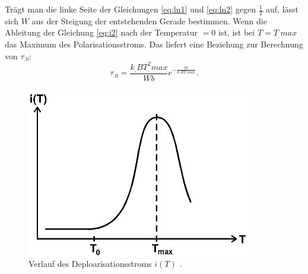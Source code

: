 Trägt man die linke Seite der Gleichungen \eqref{eq:ln1} und \eqref{eq:ln2} gegen $\frac{1}{T}$ auf, lässt sich $W$ aus der Steigung der entstehenden Gerade bestimmen.
Wenn die Ableitung der Gleichung \eqref{eq:i2} nach der Temperatur $=0$ ist, ist bei $T=T_.{max}$ das Maximum des Polarisationsstroms.
Das liefert eine Beziehung zur Berechnung von $\tau_.0$:
\begin{equation}
\tau_.0=\frac{k_.BT^2_.{max}}{W b}e^{-\frac{W}{k_.BT_.{max}}}\text{.}\label{eq:tau0}
\end{equation}
\begin{figure}
	\centering
	\includegraphics[width=\linewidth-70pt,height=\textheight-70pt,keepaspectratio]{content/images/Verlauf.jpg}
	\caption{Verlauf des Deploarisationsstroms $i(T)$ \cite{V48}.}
	\label{fig:i}
\end{figure}